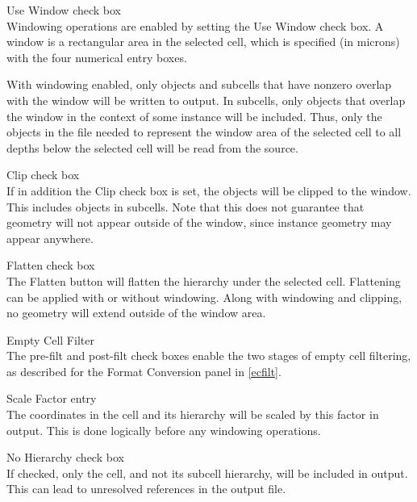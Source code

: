 \begin{description}
\item{{\cb Use Window} check box}\\
Windowing operations are enabled by setting the {\cb Use Window} check
box.  A window is a rectangular area in the selected cell, which is
specified (in microns) with the four numerical entry boxes.

With windowing enabled, only objects and subcells that have nonzero
overlap with the window will be written to output.  In subcells, only
objects that overlap the window in the context of some instance will
be included.  Thus, only the objects in the file needed to represent
the window area of the selected cell to all depths below the selected
cell will be read from the source.

\item{{\cb Clip} check box}\\
If in addition the {\cb Clip} check box is set, the objects will be
clipped to the window.  This includes objects in subcells.  Note that
this does not guarantee that geometry will not appear outside of the
window, since instance geometry may appear anywhere.

\item{{\cb Flatten} check box}\\
The {\cb Flatten} button will flatten the hierarchy under the selected
cell.  Flattening can be applied with or without windowing.  Along
with windowing and clipping, no geometry will extend outside of the
window area.

\item{\cb Empty Cell Filter}\\
The {\cb pre-filt} and {\cb post-filt} check boxes enable the two
stages of empty cell filtering, as described for the {\cb Format
Conversion} panel in \ref{ecfilt}.

\item{{\cb Scale Factor} entry}\\
The coordinates in the cell and its hierarchy will be scaled by this
factor in output.  This is done logically before any windowing
operations.

\item{{\cb No Hierarchy} check box}\\
If checked, only the cell, and not its subcell hierarchy, will be
included in output.  This can lead to unresolved references in the
output file.
\end{description}

